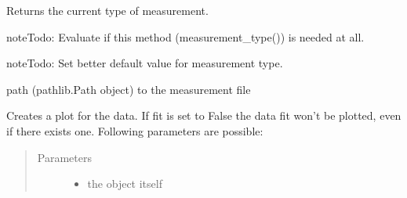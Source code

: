 \documentclass[letterpaper,10pt,english]{sphinxmanual}
\begin{document}
\begin{fulllineitems}
\begin{fulllineitems}
\begin{quote}
\begin{description}
\begin{itemize}
\end{itemize}

\end{description}\end{quote}

Returns the current type of measurement.

\begin{sphinxadmonition}{note}{\label{measurement:index-3}Todo:}
Evaluate if this method (measurement\_type()) is needed at all.
\end{sphinxadmonition}

\begin{sphinxadmonition}{note}{\label{measurement:index-4}Todo:}
Set better default value for measurement type.
\end{sphinxadmonition}

\end{fulllineitems}


\begin{fulllineitems}
\label{\detokenize{measurement:measurement.Measurement.path}}
path (pathlib.Path object) to the measurement file

\end{fulllineitems}


\begin{fulllineitems}
\label{\detokenize{measurement:measurement.Measurement.plot}}
Creates a plot for the data. If fit is set to False the data fit won’t be
plotted, even if there exists one. Following parameters are possible:
\begin{quote}\begin{description}
\item[{Parameters}] \leavevmode\begin{itemize}
\item {} 
 \textendash{} the object itself


\end{itemize}
\end{description}
\end{quote}
\end{fulllineitems}
\end{fulllineitems}
\end{document}
